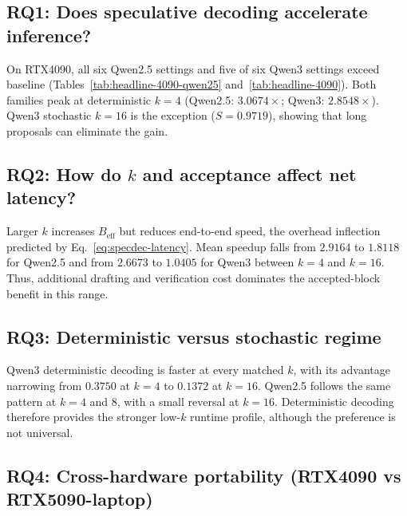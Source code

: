 \subsection{RQ1: Does speculative decoding accelerate inference?}

On RTX4090, all six Qwen2.5 settings and five of six Qwen3 settings exceed
baseline (Tables~\ref{tab:headline-4090-qwen25} and~\ref{tab:headline-4090}).
Both families peak at deterministic $k{=}4$ (Qwen2.5: $3.0674\times$; Qwen3:
$2.8548\times$). Qwen3 stochastic $k{=}16$ is the exception
($S{=}0.9719$), showing that long proposals can eliminate the gain.

\subsection{RQ2: How do $k$ and acceptance affect net latency?}

Larger $k$ increases $B_{\text{eff}}$ but reduces end-to-end speed, the
overhead inflection predicted by Eq.~\ref{eq:specdec-latency}. Mean
speedup falls from $2.9164$ to $1.8118$ for Qwen2.5 and from $2.6673$ to
$1.0405$ for Qwen3 between $k{=}4$ and $k{=}16$. Thus, additional drafting
and verification cost dominates the accepted-block benefit in this range.

\subsection{RQ3: Deterministic versus stochastic regime}

Qwen3 deterministic decoding is faster at every matched $k$, with its
advantage narrowing from $0.3750$ at $k{=}4$ to $0.1372$ at $k{=}16$.
Qwen2.5 follows the same pattern at $k{=}4$ and $8$, with a small reversal at
$k{=}16$. Deterministic decoding therefore provides the stronger low-$k$
runtime profile, although the preference is not universal.

\subsection{RQ4: Cross-hardware portability (RTX4090 vs RTX5090-laptop)}

